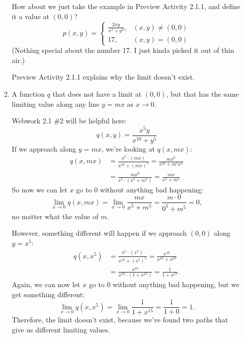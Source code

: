 \documentclass[10pt]{article}
\newenvironment{red}{\color{red}}{\ignorespacesafterend}
\begin{document}
\begin{enumerate}[leftmargin=0pt]
\begin{enumerate}
        \begin{red}
            How about we just take the example in Preview Activity 2.1.1, and define it a value at $(0, 0)$?
            \[ p(x,y) = 
            \begin{cases}
                \frac{2xy}{x^2+y^2}, & (x, y) \neq (0, 0) \\
                17, & (x, y) = (0, 0)
            \end{cases}
            \]
            (Nothing special about the number 17. I just kinda picked it out of thin air.)
            
            Preview Activity 2.1.1 explains why the limit doesn't exist.
        \end{red}
        \item A function $q$ that does not have a limit at $(0, 0)$, but that has the same limiting value along any line $y=mx$ as $x \to 0$. 
        
        \begin{red}
            Webwork 2.1 \#2 will be helpful here:
            \[q(x,y) = \frac{x^{5}y}{x^{10}+y^{5}}\]
            If we approach along $y = mx$, we're looking at $q(x, mx):$
            \begin{align*}
                q(x, mx) &= \frac{x^{5}\cdot (mx)}{x^{10}+(mx)^{5}}
                = \frac{mx^6}{x^{10} + m^5 x^5} \\
                &= \frac{mx^6}{x^5\cdot(x^5+m^5)} 
                = \frac{mx}{x^5+m^5}
            \end{align*}
            So now we can let $x$ go to 0 without anything bad happening:
            \[\lim_{x\to 0} q(x, mx) = \lim_{x \to 0} \frac{mx}{x^5+m^5} = \frac{m\cdot 0}{0^5 + m^5} = 0,\]
            no matter what the value of $m$.
            
            However, something different will happen if we approach $(0, 0)$ along $y=x^5$:
            \begin{align*}
                q(x, x^5) &= \frac{x^{5}\cdot (x^5)}{x^{10}+(x^5)^{5}}
                = \frac{x^{10}}{x^{10} + x^{25}} \\
                &= \frac{x^{10}}{x^{10}\cdot(1 + x^{15})} 
                = \frac{1}{1 + x^{15}}.
            \end{align*}
            Again, we can now let $x$ go to 0 without anything bad happening, but we get something different:
            \[\lim_{x\to 0} q(x, x^5) = \lim_{x\to 0}\frac{1}{1 + x^{15}} = \frac{1}{1+0} = 1.\]
            Therefore, the limit doesn't exist, because we've found two paths that give us different limiting values.
        \end{red}
        

\end{enumerate}
\end{enumerate}
\end{document}
